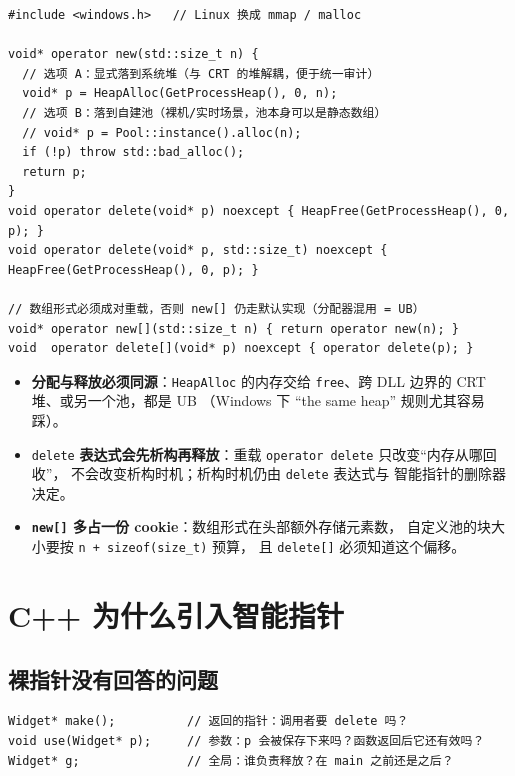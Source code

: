 \documentclass[12pt,a4paper,fontset=fandol]{ctexbook}
\begin{document}
\begin{lstlisting}[caption={全局重载：把 new 重定向到系统堆或自定义堆}]
#include <windows.h>   // Linux 换成 mmap / malloc

void* operator new(std::size_t n) {
  // 选项 A：显式落到系统堆（与 CRT 的堆解耦，便于统一审计）
  void* p = HeapAlloc(GetProcessHeap(), 0, n);
  // 选项 B：落到自建池（裸机/实时场景，池本身可以是静态数组）
  // void* p = Pool::instance().alloc(n);
  if (!p) throw std::bad_alloc();
  return p;
}
void operator delete(void* p) noexcept { HeapFree(GetProcessHeap(), 0, p); }
void operator delete(void* p, std::size_t) noexcept { HeapFree(GetProcessHeap(), 0, p); }

// 数组形式必须成对重载，否则 new[] 仍走默认实现（分配器混用 = UB）
void* operator new[](std::size_t n) { return operator new(n); }
void  operator delete[](void* p) noexcept { operator delete(p); }
\end{lstlisting}

\begin{warning}[title=落点自由的三条硬约束]
\begin{itemize}
  \item \textbf{分配与释放必须同源}：\texttt{HeapAlloc} 的内存交给
        \texttt{free}、跨 DLL 边界的 CRT 堆、或另一个池，都是 UB
        （Windows 下 ``the same heap'' 规则尤其容易踩）。
  \item \texttt{delete} \textbf{表达式会先析构再释放}：重载
        \texttt{operator delete} 只改变``内存从哪回收''，
        不会改变析构时机；析构时机仍由 \texttt{delete} 表达式与
        智能指针的删除器决定。
  \item \textbf{\texttt{new[]} 多占一份 cookie}：数组形式在头部额外存储元素数，
        自定义池的块大小要按 \texttt{n + sizeof(size\_t)} 预算，
        且 \texttt{delete[]} 必须知道这个偏移。
\end{itemize}
\end{warning}

\section{C++ 为什么引入智能指针}

\subsection{裸指针没有回答的问题}

\begin{lstlisting}
Widget* make();          // 返回的指针：调用者要 delete 吗？
void use(Widget* p);     // 参数：p 会被保存下来吗？函数返回后它还有效吗？
Widget* g;               // 全局：谁负责释放？在 main 之前还是之后？
\end{lstlisting}
\end{document}

